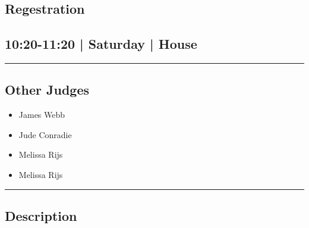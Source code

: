 \documentclass[10pt, A5]{article}
\begin{document}
		\begin{framed}
			\begin{minipage}{\textwidth}

			\setcounter{section}{17}
							\section{Regestration}
						
			\subsection*{10:20-11:20 | Saturday | House}

			\vspace{0.25cm}
			\hrule
			\vspace{0.25cm}


			\subsection*{Other Judges}
							

				\begin{multicols}{2}

			\begin{itemize}
											\item James Webb
											\item Jude Conradie
											\item Melissa Rijs
								\end{itemize}

			\vfill\null
			\columnbreak

			\begin{itemize}
											\item Melissa Rijs
								\end{itemize}

			\vfill\null

			\end{multicols}

			\vspace{0.25cm}
			\hrule
			\vspace{0.25cm}

			\begin{minipage}{\textwidth}
			\subsection*{\faListAlt \: Description}
			
			\end{minipage}


	\end{minipage}
	\end{framed}
\end{document}
